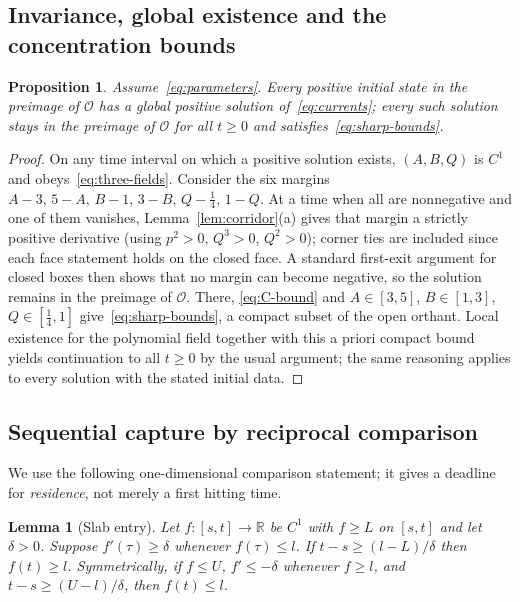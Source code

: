 \documentclass[11pt,a4paper]{article}
\theoremstyle{plain}
\newtheorem{proposition}[theorem]{Proposition}
\newtheorem{lemma}[theorem]{Lemma}
\theoremstyle{definition}
\theoremstyle{remark}
\newcommand{\R}{\mathbb R}
\newcommand{\calO}{\mathcal O}
\begin{document}
\subsection{Invariance, global existence and the concentration bounds}
\begin{proposition}\label{prop:invariance}
Assume~\eqref{eq:parameters}. Every positive initial state in the preimage of $\calO$ has a global positive solution of~\eqref{eq:currents}; every such solution stays in the preimage of $\calO$ for all $t\ge0$ and satisfies~\eqref{eq:sharp-bounds}.
\end{proposition}

\begin{proof}
On any time interval on which a positive solution exists, $(A,B,Q)$ is $C^1$ and obeys~\eqref{eq:three-fields}. Consider the six margins $A-3,\,5-A,\,B-1,\,3-B,\,Q-\tfrac14,\,1-Q$. At a time when all are nonnegative and one of them vanishes, Lemma~\ref{lem:corridor}(a) gives that margin a strictly positive derivative (using $p^2>0$, $Q^3>0$, $Q^2>0$); corner ties are included since each face statement holds on the closed face. A standard first-exit argument for closed boxes then shows that no margin can become negative, so the solution remains in the preimage of $\calO$. There, \eqref{eq:C-bound} and $A\in[3,5]$, $B\in[1,3]$, $Q\in[\tfrac14,1]$ give~\eqref{eq:sharp-bounds}, a compact subset of the open orthant. Local existence for the polynomial field together with this a priori compact bound yields continuation to all $t\ge0$ by the usual argument; the same reasoning applies to every solution with the stated initial data.
\end{proof}

\subsection{Sequential capture by reciprocal comparison}
\label{sec:capture}
We use the following one-dimensional comparison statement; it gives a deadline for \emph{residence}, not merely a first hitting time.

\begin{lemma}[Slab entry]\label{lem:slab}
Let $f:[s,t]\to\R$ be $C^1$ with $f\ge L$ on $[s,t]$ and let $\delta>0$. Suppose $f'(\tau)\ge\delta$ whenever $f(\tau)\le l$. If $t-s\ge(l-L)/\delta$ then $f(t)\ge l$. Symmetrically, if $f\le U$, $f'\le-\delta$ whenever $f\ge l$, and $t-s\ge(U-l)/\delta$, then $f(t)\le l$.
\end{lemma}
\end{document}
